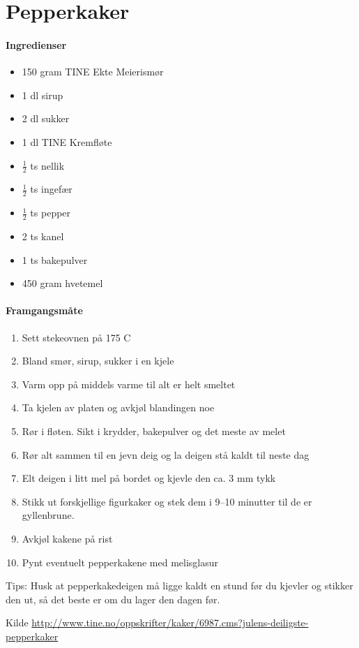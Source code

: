 \section{﻿Pepperkaker}


\paragraph{Ingredienser}
\begin{itemize}[noitemsep]
	\item 150 gram TINE Ekte Meierismør
	\item 1 dl sirup
	\item 2 dl sukker
	\item 1 dl TINE Kremfløte
	\item $\frac{1}{2}$ ts nellik
	\item $\frac{1}{2}$ ts ingefær
	\item $\frac{1}{2}$ ts pepper
	\item 2 ts kanel
	\item 1 ts bakepulver
	\item 450 gram hvetemel
\end{itemize}

\paragraph{Framgangsmåte}
\begin{enumerate}[noitemsep]
	\item Sett stekeovnen på 175 \degree C
	\item Bland smør, sirup, sukker i en kjele
	\item Varm opp på middels varme til alt er helt smeltet
	\item Ta kjelen av platen og avkjøl blandingen noe
	\item Rør i fløten. Sikt i krydder, bakepulver og det meste av melet
	\item Rør alt sammen til en jevn deig og la deigen stå kaldt til neste dag
	\item Elt deigen i litt mel på bordet og kjevle den ca. 3 mm tykk
	\item Stikk ut forskjellige figurkaker og stek dem i 9--10 minutter til de er gyllenbrune.
	\item Avkjøl kakene på rist
	\item Pynt eventuelt pepperkakene med melisglasur
\end{enumerate}



Tips: Husk at pepperkakedeigen må ligge kaldt en stund før du kjevler og stikker den ut, så det beste er om du lager den dagen før.

Kilde \url{http://www.tine.no/oppskrifter/kaker/6987.cms?julens-deiligste-pepperkaker}
